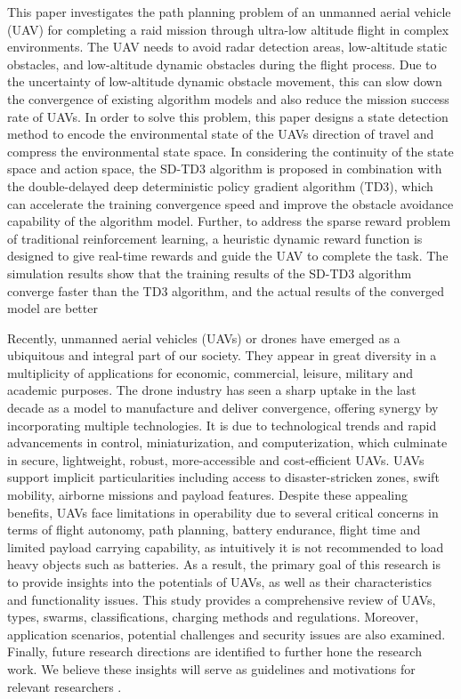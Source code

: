 \documentclass[11pt,epsf,times]{article}
\begin{document}
This paper investigates the path planning problem of an unmanned aerial vehicle (UAV) for completing a raid mission through ultra-low altitude flight in complex environments. The UAV needs to avoid radar detection areas, low-altitude static obstacles, and low-altitude dynamic obstacles during the flight process. Due to the uncertainty of low-altitude dynamic obstacle movement, this can slow down the convergence of existing algorithm models and also reduce the mission success rate of UAVs. In order to solve this problem, this paper designs a state detection method to encode the environmental state of the UAVs direction of travel and compress the environmental state space. In considering the continuity of the state space and action space, the SD-TD3 algorithm is proposed in combination with the double-delayed deep deterministic policy gradient algorithm (TD3), which can accelerate the training convergence speed and improve the obstacle avoidance capability of the algorithm model. Further, to address the sparse reward problem of traditional reinforcement learning, a heuristic dynamic reward function is designed to give real-time rewards and guide the UAV to complete the task. The simulation results show that the training results of the SD-TD3 algorithm converge faster than the TD3 algorithm, and the actual results of the converged model are better \cite{machines2023}

Recently, unmanned aerial vehicles (UAVs) or drones have emerged as a ubiquitous and integral part of our society. They appear in great diversity in a multiplicity of applications for economic, commercial, leisure, military and academic purposes. The drone industry has seen a sharp uptake in the last decade as a model to manufacture and deliver convergence, offering synergy by incorporating multiple technologies. It is due to technological trends and rapid advancements in control, miniaturization, and computerization, which culminate in secure, lightweight, robust, more-accessible and cost-efficient UAVs. UAVs support implicit particularities including access to disaster-stricken zones, swift mobility, airborne missions and payload features. Despite these appealing benefits, UAVs face limitations in operability due to several critical concerns in terms of flight autonomy, path planning, battery endurance, flight time and limited payload carrying capability, as intuitively it is not recommended to load heavy objects such as batteries. As a result, the primary goal of this research is to provide insights into the potentials of UAVs, as well as their characteristics and functionality issues. This study provides a comprehensive review of UAVs, types, swarms, classifications, charging methods and regulations. Moreover, application scenarios, potential challenges and security issues are also examined. Finally, future research directions are identified to further hone the research work. We believe these insights will serve as guidelines and motivations for relevant researchers \cite{UAVPRACTICAL2023}.
\end{document}
